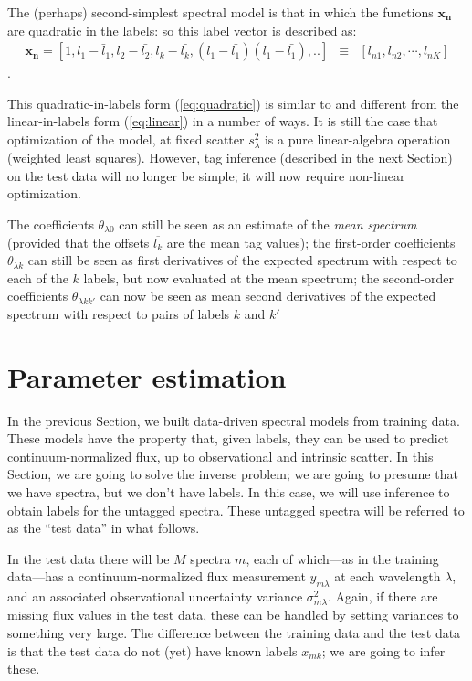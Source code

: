 \documentclass[12pt, preprint]{aastex}
\newcommand{\sectionname}{Section}
\newcommand{\set}[1]{\bm{#1}}
\newcommand{\mean}[1]{\overline{#1}}
\begin{document}
The (perhaps) second-simplest spectral model is that in which the
functions $\set{x_n}$ are quadratic in the labels: so this label vector is described as:
\begin{eqnarray}
\set{x_n} =  [1, l_1 - \bar{l}_1, l_2 - \bar{l_2}, l_k - \bar{l_k}, (l_1 - \bar{l_1})(l_1 - \bar{l_1}), .. ] &\equiv& [l_{n1}, l_{n2}, \cdots, l_{nK}]
\end{eqnarray}.

This quadratic-in-labels form (\ref{eq:quadratic}) is similar to and
different from the linear-in-labels form (\ref{eq:linear}) in a number
of ways.
It is still the case that optimization of the model, at fixed scatter
$s_\lambda^2$ is a pure linear-algebra operation (weighted least
squares).
However, tag inference (described in the next Section) on the test
data will no longer be simple; it will now require non-linear
optimization.

The coefficients $\theta_{\lambda 0}$ can still be seen as an estimate of the
\emph{mean spectrum} (provided that the offsets $\mean{l_k}$ are the
mean tag values); the first-order coefficients $\theta_{\lambda k}$ can still
be seen as first derivatives of the expected spectrum with respect to
each of the $k$ labels, but now evaluated at the mean spectrum; the
second-order coefficients $\theta_{\lambda kk'}$ can now be seen as mean
second derivatives of the expected spectrum with respect to pairs of
labels $k$ and $k'$



\section{Parameter estimation}
\label{sec:paramestimate}

In the previous \sectionname, we built data-driven spectral models
from training data.
These models have the property that, given labels, they can be used to
predict continuum-normalized flux, up to observational and intrinsic
scatter.
In this \sectionname, we are going to solve the inverse problem; we
are going to presume that we have spectra, but we don't have labels.
In this case, we will use inference to obtain labels for the untagged
spectra.
These untagged spectra will be referred to as the ``test data'' in
what follows.

In the test data there will be $M$ spectra $m$, each of which---as in
the training data---has a continuum-normalized flux measurement
$y_{m\lambda}$ at each wavelength $\lambda$, and an
associated observational uncertainty variance $\sigma_{m\lambda}^2$.
Again, if there are missing flux values in the test data, these can be
handled by setting variances to something very large.
The difference between the training data and the test data is that the
test data do not (yet) have known labels $x_{mk}$; we are going to infer
these.
\end{document}
